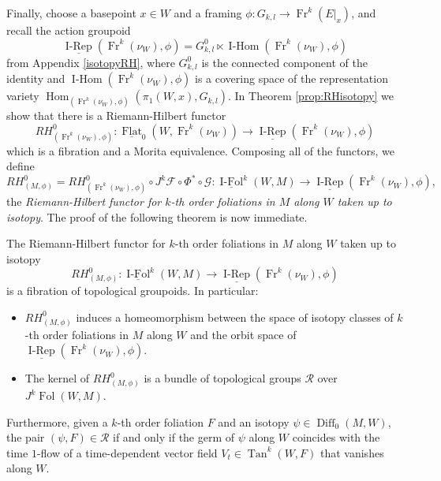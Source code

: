\documentclass[10pt]{amsart}
\newcommand{\F}{{\mathcal{F}}}
\newcommand{\Hom}{\operatorname{Hom}}
\newcommand{\Diff}{{\operatorname{Diff}}}
\newcommand{\FolObj}{{\operatorname{Fol}}}
\newcommand{\FlatCat}{{\underline{\operatorname{Flat}}}}
\newcommand{\IsotopyCat}{{\underline{\operatorname{I-Rep}}}}
\newcommand{\IsotopyObj}{{\operatorname{I-Hom}}}
\newcommand{\IsoCat}{\underline{\operatorname{I-Fol}}}
\newcommand{\Tan}{{\operatorname{Tan}}}
\newcommand{\Fr}{{\operatorname{Fr}}}
\numberwithin{theoremalpha}{section}
\numberwithin{equation}{section}
\numberwithin{definition}{section}
\numberwithin{theorem}{section}
\numberwithin{proposition}{section}
\numberwithin{lemma}{section}
\numberwithin{example}{section}
\numberwithin{remark}{section}
\numberwithin{corollary}{section}
\numberwithin{question}{section}
\numberwithin{problem}{section}
\numberwithin{assumption}{section}
\theoremstyle{named}
\numberwithin{equation}{section}
\begin{document}
Finally, choose a basepoint $x \in W$ and a framing $\phi : G_{k,l} \to \Fr^k(E|_x)$, and recall the action groupoid 
\[
\IsotopyCat(\Fr^k(\nu_{W}),\phi) = G_{k,l}^0 \ltimes \IsotopyObj(\Fr^k(\nu_{W}),\phi)
\]
from Appendix \ref{isotopyRH}, where $G_{k,l}^0$ is the connected component of the identity and $\IsotopyObj(\Fr^k(\nu_{W}),\phi)$ is a covering space of the representation variety $\Hom_{(\Fr^k(\nu_{W}),\phi)}(\pi_{1}(W, x), G_{k,l})$. In Theorem \ref{prop:RHisotopy} we show that there is a Riemann-Hilbert functor 
\[ RH^{0}_{(\Fr^{k}(\nu_{W}), \phi)} : \FlatCat_{0}(W, \Fr^{k}(\nu_{W})) \to \IsotopyCat(\Fr^k(\nu_{W}),\phi) \] 
which is a fibration and a Morita equivalence. Composing all of the functors, we define 
\[
RH^{0}_{(M,\phi)} = RH^{0}_{(\Fr^{k}(\nu_{W}), \phi)} \circ J^{k}\F \circ \Phi^* \circ \mathcal{G} : \IsoCat^{k}(W,M)  \to \IsotopyCat(\Fr^k(\nu_{W}),\phi), 
\]
the \emph{Riemann-Hilbert functor for $k$-th order foliations in $M$ along $W$ taken up to isotopy}. The proof of the following theorem is now immediate. 

\begin{theorem} \label{RHuptoisotopy}
The Riemann-Hilbert functor for $k$-th order foliations in $M$ along $W$ taken up to isotopy 
\[
RH^{0}_{(M,\phi)} : \IsoCat^{k}(W,M)  \to \IsotopyCat(\Fr^k(\nu_{W}),\phi) 
\]
is a fibration of topological groupoids. In particular:
\begin{itemize}
\item $RH^{0}_{(M,\phi)}$ induces a homeomorphism between the space of isotopy classes of $k$-th order foliations in $M$ along $W$ and the orbit space of $\IsotopyCat(\Fr^k(\nu_{W}),\phi)$.
\item The kernel of $RH^{0}_{(M,\phi)}$ is a bundle of topological groups $\mathcal{R}$ over $J^k\FolObj(W,M)$. 
\end{itemize}
Furthermore, given a $k$-th order foliation $F$ and an isotopy $\psi \in \Diff_0(M, W)$, the pair $(\psi, F) \in \mathcal{R}$ if and only if the germ of $\psi$ along $W$ coincides with the time $1$-flow of a time-dependent vector field $V_{t} \in \Tan^{k}(W, F)$ that vanishes along $W$.
\end{theorem}
\end{document}
